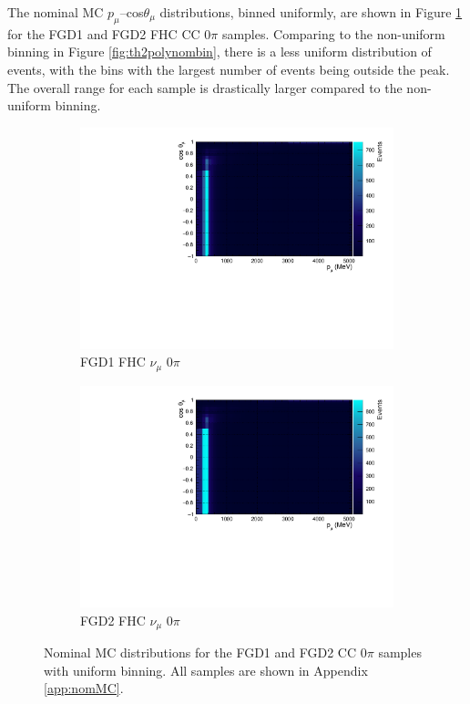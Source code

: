 The nominal MC $p_{\mu}$--cos$\theta_{\mu}$ distributions, binned uniformly, are shown in Figure \ref{fig:2dnom} for the FGD1 and FGD2 FHC CC 0$\pi$ samples. Comparing to the non-uniform binning in Figure \ref{fig:th2polynombin}, there is a less uniform distribution of events, with the bins with the largest number of events being outside the peak. The overall range for each sample is drastically larger compared to the non-uniform binning.

\begin{figure}[!htbp]
\centering
\begin{subfigure}{.7\textwidth}
  \centering
  \includegraphics[width=0.95\linewidth]{figs/NomMC_MC_FGD1_numuCC_0pi}
  \caption{FGD1 FHC $\nu_{\mu}$ 0$\pi$}
\end{subfigure}
\begin{subfigure}{.7\textwidth}
  \centering
  \includegraphics[width=0.95\linewidth]{figs/NomMC_MC_FGD2_numuCC_0pi}
  \caption{FGD2 FHC $\nu_{\mu}$ 0$\pi$}
\end{subfigure}
\caption{Nominal MC distributions for the FGD1 and FGD2 CC 0$\pi$ samples with uniform binning. All samples are shown in Appendix \ref{app:nomMC}.}
\label{fig:2dnom}
\end{figure}

